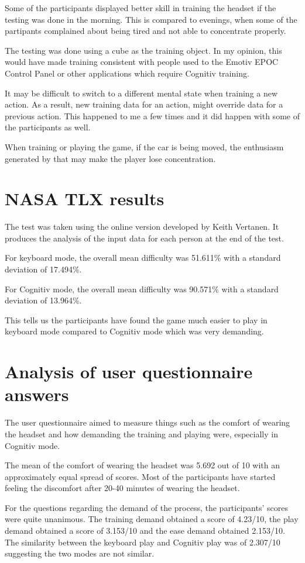 Some of the participants displayed better skill in training the headset if the testing was done in the morning. This is compared to evenings, when some of the partipants complained about being tired and not able to concentrate properly.

The testing was done using a cube as the training object. In my opinion, this would have made training consistent with people used to the Emotiv EPOC Control Panel or other applications which require Cognitiv training. 

It may be difficult to switch to a different mental state when training a new action. As a result, new training data for an action, might override data for a previous action. This happened to me a few times and it did happen with some of the participants as well.

When training or playing the game, if the car is being moved, the enthusiasm generated by that may make the player lose concentration.

\section{NASA TLX results}
The test was taken using the \cite{nasatlx} online version developed by Keith Vertanen. It produces the analysis of the input data for each person at the end of the test. 

For keyboard mode, the overall mean difficulty was 51.611\% with a standard deviation of 17.494\%.

For Cognitiv mode, the overall mean difficulty was 90.571\% with a standard deviation of 13.964\%.

This tells us the participants have found the game much easier to play in keyboard mode compared to Cognitiv mode which was very demanding.

\section{Analysis of user questionnaire answers}
The user questionnaire aimed to measure things such as the comfort of wearing the headset and how demanding the training and playing were, especially in Cognitiv mode.

The mean of the comfort of wearing the headset was 5.692 out of 10 with an approximately equal spread of scores. Most of the participants have started feeling the discomfort after 20-40 minutes of wearing the headset. 

For the questions regarding the demand of the process, the participants' scores were quite unanimous. The training demand obtained a score of 4.23/10, the play demand obtained a score of 3.153/10 and the ease demand obtained 2.153/10. The similarity between the keyboard play and Cognitiv play was of 2.307/10 suggesting the two modes are not similar.

